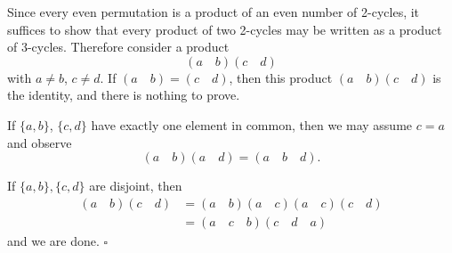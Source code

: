 Since every even permutation is a product of an even number of 2-cycles, it suffices to show that every product of two 2-cycles may be written as a product of 3-cycles. Therefore consider a product
$$ (a \quad b)(c \quad d) $$
with $a \neq b$, $c \neq d$. If $(a \quad b) = (c \quad d)$, then this product \underline{$(a \quad b)(c \quad d)$} is the identity, and there is nothing to prove.

If $\{a, b\}$, $\{c, d\}$ have exactly one element in common,
then we may assume $c = a$ and observe
$$ (a \quad b)(a \quad d) = (a \quad b \quad d). $$

If $\{a, b\}, \{c, d\}$ are disjoint, then
\begin{align*}
(a \quad b)(c \quad d) &= (a \quad b)(a \quad c)(a \quad c)(c \quad d) \\
&= (a \quad c \quad b)(c \quad d \quad a)
\end{align*}
and we are done.
\hfill $\square$